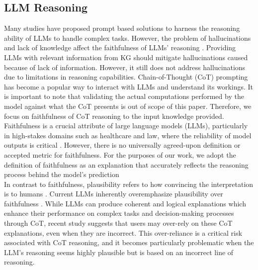 \documentclass[11pt,a4paper]{article}
\begin{document}
\subsection{LLM Reasoning} Many studies have proposed prompt based solutions to harness the reasoning ability of LLMs to handle complex tasks. However, the problem of hallucinations and lack of knowledge affect the faithfulness of LLMs’ reasoning \cite{luo2023reasoning}. Providing LLMs with relevant information from KG should mitigate hallucinations caused because of lack of information. However, it still does not address hallucinations due to limitations in reasoning capabilities. 
Chain-of-Thought (CoT) prompting \cite{wei2023chainofthoughtpromptingelicitsreasoning} has become a popular way to interact with LLMs and understand its workings. It is important to note that validating the actual computations performed by the model against what the CoT presents is out of scope of this paper. Therefore, we focus on faithfulness of CoT reasoning to the input knowledge provided.\\

\noindent Faithfulness is a crucial attribute of large language models (LLMs), particularly in high-stakes domains such as healthcare and law, where the reliability of model outputs is critical \cite{agarwal2024faithfulnessvsplausibilityunreliability}. However, there is no universally agreed-upon definition or accepted metric for faithfulness. For the purposes of our work, we adopt the definition of faithfulness as an explanation that accurately reflects the reasoning process behind the model's prediction \cite{lyu2024faithfulmodelexplanationnlp}\\

\noindent In contrast to faithfulness, plausibility refers to how convincing the
interpretation is to humans \cite{jacovi2020towards}. Current LLMs inherently overemphasize plausibility over faithfulness \cite{agarwal2024faithfulnessvsplausibilityunreliability}. While LLMs can produce coherent and logical explanations which enhance their performance on complex tasks and decision-making processes through CoT, recent study \cite{si2024largelanguagemodelshelp} suggests that users may over-rely on these CoT explanations, even when they are incorrect. This over-reliance is a critical risk associated with CoT reasoning, and it becomes particularly problematic when the LLM’s reasoning seems highly plausible but is based on an incorrect line of reasoning.
\end{document}
